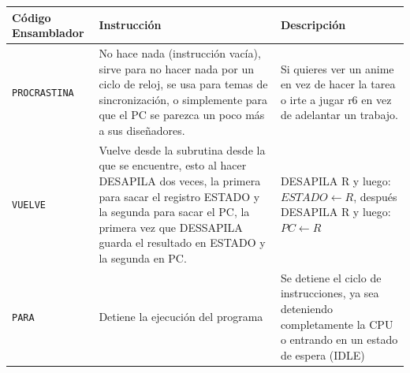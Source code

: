 \documentclass{article}
\begin{document}
\begin{longtable}{|p{}|p{}|p{}|}
  \hline
  \textbf{Código Ensamblador}                                                                                                                                                                                                                   & \textbf{Instrucción}              & \textbf{Descripción} \\
  \hline
  \texttt{PROCRASTINA}                                                                                                                                                                                                                          &
  No hace nada (instrucción vacía), sirve para no hacer nada por un ciclo de reloj,
  se usa para temas de sincronización, o simplemente para que el PC se parezca un poco más
  a sus diseñadores.                                                                                                                                                                                                                            &
  Si quieres ver un anime en vez de hacer la tarea o irte a jugar r6 en vez de adelantar
  un trabajo.                                                                                                                                                                                                                                                                                              \\
  \hline
  \texttt{VUELVE}                                                                                                                                                                                                                               &
  Vuelve desde la subrutina desde la que se encuentre, esto al hacer DESAPILA dos veces, la primera para sacar el registro ESTADO y la segunda para sacar el PC, la primera vez que DESSAPILA guarda el resultado en ESTADO y la segunda en PC. &
  DESAPILA R y luego: $ESTADO \leftarrow R$, después DESAPILA R y luego: $PC \leftarrow R$                                                                                                                                                                                                                 \\
  \hline
  \texttt{PARA}                                                                                                                                                                                                                                 & Detiene la ejecución del programa &
  Se detiene el ciclo de instrucciones, ya sea deteniendo completamente la CPU o
  entrando en un estado de espera (IDLE)                                                                                                                                                                                                                                                                   \\
  \hline
\end{longtable}
\end{document}

